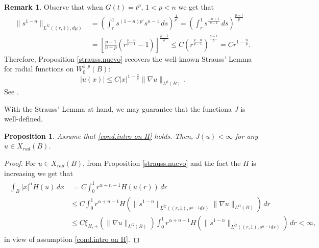 \documentclass[leqno,twoside, 12pt]{amsart}
\theoremstyle{plain}
\numberwithin{equation}{section} \numberwithin{figure}{section}
\newtheorem{proposition}[theorem]{Proposition}
\theoremstyle{definition}
\newtheorem{remark}[theorem]{Remark}
\numberwithin{equation}{section}
\begin{document}
\begin{remark}Observe that when $G(t)=t^p$, $1<p<n$ we get that
\begin{align*}
\|s^{1-n}\|_{L^{\widetilde G}((r,1),d\mu)} 
&= \left( \int_r^1 s^{(1-n)p'} s^{n-1}\,ds\right)^{\frac{1}{p'}}
= \left( \int_r^1 s^\frac{-n+1}{p-1}\,ds\right)^{\frac{p-1}{p}}\\
&= \left[  \frac{p-1}{n-p}\left(r^\frac{p-n}{p-1}-1\right)\right]^{\frac{p-1}{p}}
\leq C\left(  r^\frac{p-n}{p-1}\right)^{\frac{p-1}{p}}= Cr^{1-\frac{n}{p}}.
\end{align*}
Therefore, Proposition \ref{strauss.nuevo} recovers the well-known Strauss' Lemma for radial functions on $W^{1,p}_0(B)$:
$$
|u(x)|\leq C |x|^{1-\frac{n}{p}}\|\nabla u\|_{L^p(B)}.
$$ See \cite[Lemma II.1 and Remark II.3]{Lions}.
\end{remark}

With the Strauss' Lemma at hand, we may  guarantee  that the functiona $J$ is well-defined. 


\begin{proposition}\label{condition}
Assume that \eqref{cond.intro on H} holds. Then, $J(u)<\infty$ for any $u\in X_{rad}(B)$.
\end{proposition}
\begin{proof}


For  $u\in X_{rad}(B)$,  from Proposition \ref{strauss.nuevo} and the fact the $H$ is increasing we get that
\begin{align} \label{cota}
\begin{split}
\int_B |x|^\alpha H( u )\,dx  &\ =C\int_0^1 r^{\alpha+n-1}H(u(r))\,dr \\& \leq  C
\int_0^1 r^{\alpha+n-1} H(  \|s^{1-n}\|_{L^{\widetilde G}((r,1),s^{n-1}ds)} \|\nabla u\|_{L^G(B)})\,dr\\
&\leq C
\xi_{H,+}(\|\nabla u\|_{L^G(B)})
\int_0^1 r^{\alpha+n-1} H(  \|s^{1-n}\|_{L^{\widetilde G}((r,1),s^{n-1}ds)})\,dr <\infty,
\end{split}
\end{align}
in view of assumption \eqref{cond.intro on H}.
\end{proof}
\end{document}
